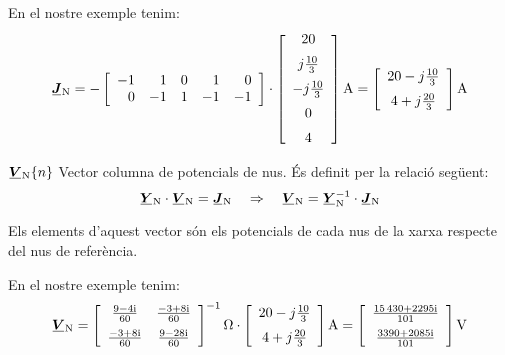 \begin{list}{}
   En el nostre exemple tenim:
   \[
      \mcmplx{J}\ped{N} = -
      \begin{bmatrix}\begin{array}{rrrrr} 
      	-1 & 1  & 0 &  1 & 0 \\  0 & -1 & 1 & -1 & -1
      \end{array}\end{bmatrix} \cdot
      \begin{bmatrix}\begin{array}{c}
            20 \\[2mm]
             j \frac{10}{3} \\[2mm]
             -j \frac{10}{3} \\[2mm]
             0 \\[2mm]
              4
      \end{array}\end{bmatrix}\unit{A}
      =
      \begin{bmatrix}\begin{array}{c}
            20 - j \frac{10}{3} \\[2mm]
            4 + j \frac{20}{3}
      \end{array}\end{bmatrix}\unit{A}
   \]

   \item[$\mcmplx{V}\ped{N}\{n\}$] Vector columna de potencials de nus. És definit per la relació següent:
   \begin{equation}
      \mcmplx{Y}\ped{N} \cdot \mcmplx{V}\ped{N} = \mcmplx{J}\ped{N} \quad\Rightarrow\quad
      \mcmplx{V}\ped{N} = \mcmplx{Y}\ped{N}^{-1} \cdot \mcmplx{J}\ped{N} \label{eq:vn}
   \end{equation}

   Els elements d'aquest vector són els potencials de cada nus de la xarxa respecte del nus de referència.

   En el nostre exemple tenim:
   \[
      \mcmplx{V}\ped{N} =
      \begin{bmatrix}\begin{array}{cc}
            \frac{\complexnum{ 9 - j 4}}{60} & \frac{\complexnum{-3 + j 8}}{60} \\[2mm]
            \frac{\complexnum{-3 + j 8}}{60} & \frac{\complexnum{9 - j 28}}{60}
      \end{array}\end{bmatrix}^{-1}\unit{\ohm} \cdot
      \begin{bmatrix}\begin{array}{c}
            20 - j \frac{10}{3} \\[2mm]
            4 + j \frac{20}{3}
      \end{array}\end{bmatrix}\unit{A}
      =
      \begin{bmatrix}\begin{array}{c}
            \frac{\complexnum{15430 + j 2295}}{101} \\[2mm]
            \frac{\complexnum{3390 + j 2085}}{101}
      \end{array}\end{bmatrix}\unit{V}
      \label{eq:vn_exemp}
   \]


\end{list}
